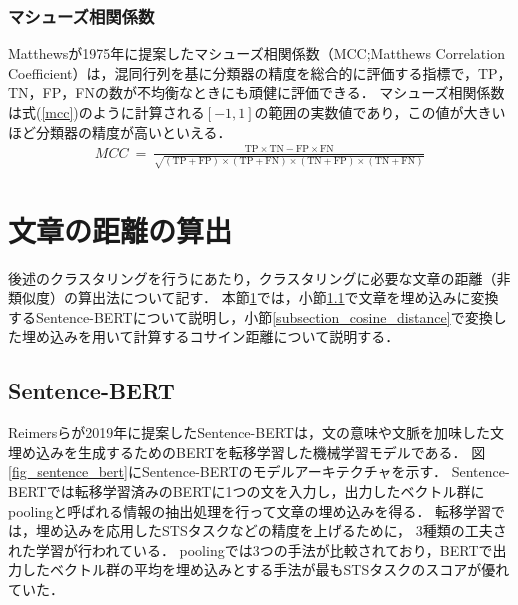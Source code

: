 \documentclass[12pt,a4j]{jreport}
\begin{document}
\subsubsection{マシューズ相関係数}
\label{subsubsection_mcc}
Matthewsが1975年に提案したマシューズ相関係数（MCC;Matthews Correlation Coefficient）は，混同行列を基に分類器の精度を総合的に評価する指標で，TP，TN，FP，FNの数が不均衡なときにも頑健に評価できる\cite{chicco_advantages_2020}．
マシューズ相関係数は式(\ref{mcc})のように計算される$[-1, 1]$の範囲の実数値であり，この値が大きいほど分類器の精度が高いといえる．
\begin{align}
  MCC ~=~ \frac{\mathrm{TP} \times \mathrm{TN}-\mathrm{FP} \times \mathrm{FN}}{\sqrt{(\mathrm{TP}+\mathrm{FP}) \times(\mathrm{TP}+\mathrm{FN}) \times(\mathrm{TN}+\mathrm{FP}) \times(\mathrm{TN}+\mathrm{FN})}}
  \label{mcc}
\end{align}


\section{文章の距離の算出}
\label{section_sentence_distance}
後述のクラスタリングを行うにあたり，クラスタリングに必要な文章の距離（非類似度）の算出法について記す．
本節\ref{section_sentence_distance}では，小節\ref{subsection_sentence_bert}で文章を埋め込みに変換するSentence-BERTについて説明し，小節\ref{subsection_cosine_distance}で変換した埋め込みを用いて計算するコサイン距離について説明する．

\subsection{Sentence-BERT}
\label{subsection_sentence_bert}
Reimersらが2019年に提案したSentence-BERTは，文の意味や文脈を加味した文埋め込みを生成するためのBERTを転移学習した機械学習モデルである\cite{reimers_sentence-bert_2019}．
図\ref{fig_sentence_bert}にSentence-BERTのモデルアーキテクチャを示す．
Sentence-BERTでは転移学習済みのBERTに1つの文を入力し，出力したベクトル群にpoolingと呼ばれる情報の抽出処理を行って文章の埋め込みを得る．
転移学習では，埋め込みを応用したSTSタスクなどの精度を上げるために，
3種類の工夫された学習が行われている．
poolingでは3つの手法が比較されており，BERTで出力したベクトル群の平均を埋め込みとする手法が最もSTSタスクのスコアが優れていた．
\end{document}
